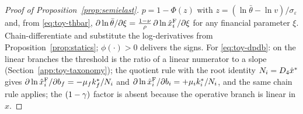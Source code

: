 \documentclass[12pt]{article}
\begin{document}
\begin{proof}[Proof of Proposition~\ref{prop:semielast}]
$p=1-\Phi(z)$ with
$z=(\ln\bar\theta-\ln v)/\sigma_{\varepsilon}$ and, from
\eqref{eq:toy-thbar},
$\partial\ln\bar\theta/\partial\xi
=\frac{1-\nu}{\rho}\,\partial\ln\hat{x}^{\mathrm{F}}_{i}/\partial\xi$ for any
financial parameter $\xi$. Chain-differentiate and substitute the
log-derivatives from Proposition~\ref{prop:statics};
$\phi(\cdot)>0$ delivers the signs. For \eqref{eq:toy-dpdb}: on the
linear branches the threshold is the ratio of a linear numerator to a
slope (Section~\ref{app:toy-taxonomy}); the quotient rule with the
root identity $N_{i}=D_{4}\hat x^{*}$ gives
$\partial\ln\hat{x}^{\mathrm{F}}_{i}/\partial b_{f}
=-\mu_{f}k^{*}_{f}/N_{i}$ and
$\partial\ln\hat{x}^{\mathrm{F}}_{i}/\partial b_{i}
=+\mu_{i}k^{*}_{i}/N_{i}$, and the same chain rule
applies; the $(1-\gamma)$ factor is absent because the operative branch
is linear in $\hat x$.
\end{proof}
 
\end{document}
